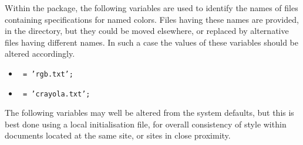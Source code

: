 \bigskip\noindent
Within the  package, the following variables are used to
identify the names of files containing specifications for named colors.
Files having these names are provided, in the 
directory, but they could be moved elsewhere,
or replaced by alternative files having different names.
In such a case the values of these variables should be altered accordingly.
%
\begin{itemize}
\item []\texttt{ = 'rgb.txt';}
\item []\texttt{ = 'crayola.txt';}
\end{itemize}

\bigskip\noindent
The following variables may well be altered from the system defaults,
but this is best done using a local  initialisation file,
for overall consistency of style within documents located at the same site,
or sites in close proximity.

